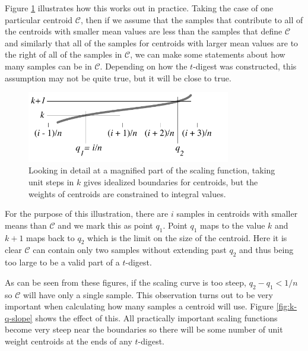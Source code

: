 \documentclass[11pt]{amsart}
\begin{document}
Figure \ref{fig:k-q-limits} illustrates how this works out in practice. Taking the case of one particular centroid $\mathcal C$, then if we assume that the samples that contribute to all of the centroids with smaller mean values are less than the samples that define $\mathcal C$ and similarly that all of the samples for centroids with larger mean values are to the right of all of the samples in $\mathcal C$, we can make some statements about how many samples can be in $\mathcal C$. Depending on how the $t$-digest was constructed, this assumption may not be quite true, but it will be close to true.
\begin{figure}[htbp] %
   \centering
   \includegraphics[width=3.5in]{../t-digest-paper/k-q-diagram/k-q-limits.pdf} 
   \caption{Looking in detail at a magnified part of the scaling function, taking unit steps in $k$ gives idealized boundaries for centroids, but the weights of centroids are  constrained to integral values. }
   \label{fig:k-q-limits}
\end{figure}
For the purpose of this illustration, there are $i$ samples in centroids with smaller means than $\mathcal C$ and we mark this as point $q_1$. Point $q_1$ maps to the value $k$ and $k+1$ maps back to $q_2$ which is the limit on the size of the centroid. Here it is clear $\mathcal C$ can contain only two samples without extending past $q_2$ and thus being too large to be a valid part of a $t$-digest.

As can be seen from these figures, if the scaling curve is too steep, $q_2-q_1 < 1/n$ so $\mathcal C$ will have only a single sample. This observation turns out to be very important when calculating how many samples a centroid will use. Figure \ref{fig:k-q-slope} shows the effect of this. All practically important scaling functions become very steep near the boundaries so there will be some number of unit weight centroids at the ends of any $t$-digest. 
\end{document}
